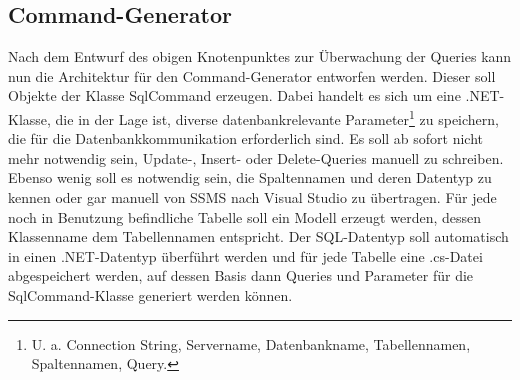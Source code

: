 \documentclass[11pt,toc=sectionentrywithoutdots, 
headheight=44pt, headings=optiontoheadandtoc, hyperfootnotes=false, hypertexnames=false]{scrartcl}
\begin{document}
\subsection{Command-Generator}
Nach dem Entwurf des obigen Knotenpunktes zur Überwachung der Queries kann nun die Architektur für den Command-Generator entworfen werden. Dieser soll Objekte der Klasse \gls{SqlCommand} erzeugen. Dabei handelt es sich um eine .NET-Klasse, die in der Lage ist, diverse datenbankrelevante Parameter\footnote{U. a. \gls{Connection String}, Servername, Datenbankname, Tabellennamen, Spaltennamen, Query.} zu speichern, die für die Datenbankkommunikation erforderlich sind. Es soll ab sofort nicht mehr notwendig sein, Update-, Insert- oder Delete-Queries manuell zu schreiben. Ebenso wenig soll es notwendig sein, die Spaltennamen und deren Datentyp zu kennen oder gar manuell von SSMS nach Visual Studio zu übertragen. Für jede noch in Benutzung befindliche Tabelle soll ein Modell erzeugt werden, dessen Klassenname dem Tabellennamen entspricht. Der SQL-Datentyp soll automatisch in einen .NET-Datentyp überführt werden und für jede Tabelle eine .cs-Datei abgespeichert werden, auf dessen Basis dann Queries und Parameter für die SqlCommand-Klasse generiert werden können.
\end{document}

